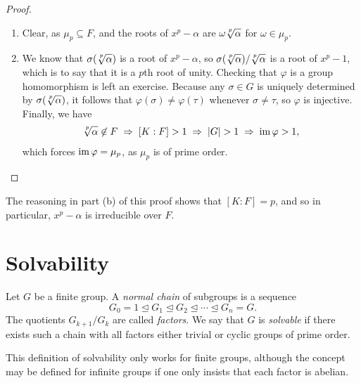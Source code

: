 \begin{proof}~
    \begin{enumerate}[label=(\alph*)]
        \item Clear, as $\mu_p \subseteq F$, and the roots of $x^p - \alpha$ are $\omega \sqrt[\uproot{3} p]\alpha$ for $\omega \in \mu_p$.
        \item We know that $\sigma(\sqrt[\uproot{3} p]{\alpha})$ is a root of $x^p - \alpha$, so $\sigma(\sqrt[\uproot{3} p]{\alpha})/\sqrt[\uproot{3} p]{\alpha}$ is a root of $x^p - 1$, which is to say that it is a $p$th root of unity. Checking that $\varphi$ is a group homomorphism is left an exercise. Because any $\sigma \in G$ is uniquely determined by $\sigma(\sqrt[\uproot{3} p]{\alpha})$, it follows that $\varphi(\sigma) \neq \varphi(\tau)$ whenever $\sigma \neq \tau$, so $\varphi$ is injective. Finally, we have
        \begin{align*}
            \sqrt[\uproot{3} p]{\alpha} \not\in F
            \; \Rightarrow \;
            [K : F] > 1
            \; \Rightarrow \;
            |G| > 1
            \; \Rightarrow \;
            \im{\varphi} > 1,
        \end{align*}
        which forces $\operatorname{im}{\varphi} = \mu_p$, as $\mu_p$ is of prime order. \qedhere
    \end{enumerate}
\end{proof}

\begin{remark}
    The reasoning in part (b) of this proof shows that $[K : F] = p$, and so in particular, $x^p - \alpha$ is irreducible over $F$.
\end{remark}

\section{Solvability}

\begin{definition}
    Let $G$ be a finite group. A \emph{normal chain} of subgroups is a sequence
    \[
        G_0 = 1 \unlhd G_1 \unlhd G_2 \unlhd \cdots \unlhd G_n = G.
    \]
    The quotients $G_{k + 1}/G_k$ are called \emph{factors}. We say that $G$ is \emph{solvable} if there exists such a chain with all factors either trivial or cyclic groups of prime order.
\end{definition}

\begin{remark}
    This definition of solvability only works for finite groups, although the concept may be defined for infinite groups if one only insists that each factor is abelian.
\end{remark}

